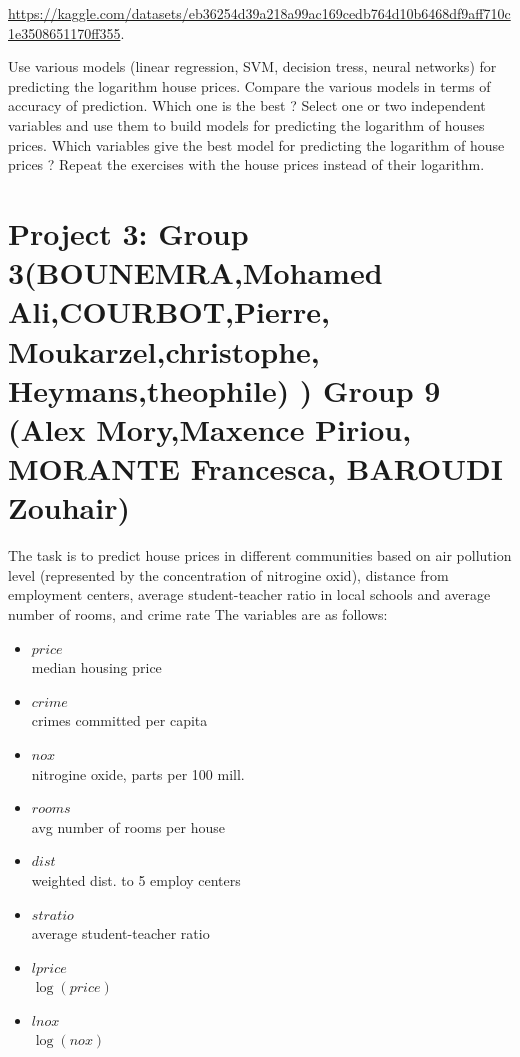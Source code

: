 \documentclass{article}
\begin{document}
   \url{https://kaggle.com/datasets/eb36254d39a218a99ac169cedb764d10b6468df9aff710c1e3508651170ff355}.

   Use various models (linear regression, SVM, decision tress, neural networks) for predicting the logarithm house prices. Compare the various models in terms of accuracy of prediction. Which one is the best ? 
 Select one or two independent variables  and use them to build models for predicting the logarithm of houses prices. Which variables give the best model for predicting  the logarithm of house prices  ?  Repeat the exercises with the house prices instead of their logarithm. 
 
 


\section*{Project 3: Group 3(BOUNEMRA,Mohamed Ali,COURBOT,Pierre, Moukarzel,christophe,
Heymans,theophile)
) Group 9 (Alex Mory,Maxence Piriou, MORANTE  Francesca, BAROUDI Zouhair) }


    The task is to predict house prices in different communities based on air pollution level (represented by the concentration of nitrogine oxid), 
distance from employment centers, average student-teacher ratio 
 in local schools and average number of rooms, and crime rate The variables are as follows:
    \begin{itemize}
    \item{$price$ \\}       
	median housing price
    \item{$crime$ \\}                    
		crimes committed per capita
    \item{$nox$ \\}                      
	nitrogine oxide, parts per 100 mill.
    \item{$rooms$ \\}                    
    avg number of rooms per house
    \item{$dist$ \\}                     
      weighted dist. to 5 employ centers
    \item{$stratio$ \\}                  average student-teacher ratio
    \item{$lprice$ \\}                   $\log(price)$
    \item{$lnox$ \\}                     $\log(nox)$
   \end{itemize}
\end{document}
